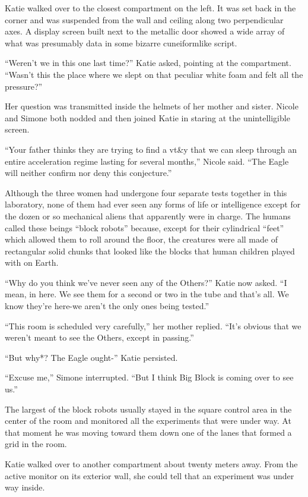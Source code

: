 \documentclass[]{article}
\begin{document}
{Katie walked over to the closest compartment on the left.  It was set back in the corner and was suspended from the wall and ceiling along two perpendicular axes.  A display screen built next to the metallic door showed a wide array of what was presumably data in some bizarre cuneiformlike script.

“Weren’t we in this one last time?” Katie asked, pointing at the compartment.  “Wasn’t this the place where we slept on that peculiar white foam and felt all the pressure?”

Her question was transmitted inside the helmets of her mother and sister.  Nicole and Simone both nodded and then joined Katie in staring at the unintelligible screen.

“Your father thinks they are trying to find a vt\&y that we can sleep through an entire acceleration regime lasting for several months,” Nicole said.  “The Eagle will neither confirm nor deny this conjecture.”

Although the three women had undergone four separate tests together in this laboratory, none of them had ever seen any forms of life or intelligence except for the dozen or so mechanical aliens that apparently were in charge.  The humans called these beings “block robots” because, except for their cylindrical “feet” which allowed them to roll around the floor, the creatures were all made of rectangular solid chunks that looked like the blocks that human children played with on Earth.

“Why do you think we’ve never seen any of the Others?” Katie now asked.  “I mean, in here.  We see them for a second or two in the tube and that’s all.  We know they’re here-we aren’t the only ones being tested.”

“This room is scheduled very carefully,” her mother replied.  “It’s obvious that we weren’t meant to see the Others, except in passing.”

“But why*? The Eagle ought-” Katie persisted.

“Excuse me,” Simone interrupted.  “But I think Big Block is coming over to see us.”

The largest of the block robots usually stayed in the square control area in the center of the room and monitored all the experiments that were under way.  At that moment he was moving toward them down one of the lanes that formed a grid in the room.

Katie walked over to another compartment about twenty meters away.  From the active monitor on its exterior wall, she could tell that an experiment was under way inside.

}
\end{document}
